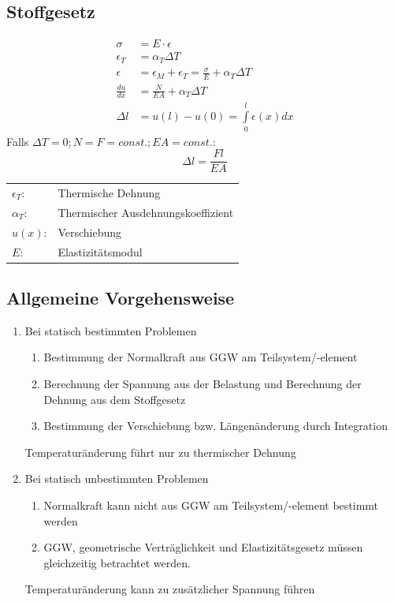 \documentclass[a4paper,twocolumn,10pt]{article}
\begin{document}
\subsection{Stoffgesetz}
\begin{equation*}
\begin{split}
\sigma&=E\cdot\epsilon\\
\epsilon_T&=\alpha_T\Delta T\\
\epsilon&=\epsilon_M+\epsilon_T=\frac{\sigma}{E}+\alpha_T\Delta T\\
\frac{du}{dx}&=\frac{N}{EA}+\alpha_T\Delta T\\
\Delta l&=u(l)-u(0)=\int\limits_0^l\epsilon(x)dx
\end{split}
\end{equation*}
Falls $\Delta T=0;N=F=const.; EA=const.$:
\begin{equation*}
\Delta l=\frac{Fl}{EA}
\end{equation*}
\begin{tabular}{ll}
$\epsilon_T$: & Thermische Dehnung\\
$\alpha_T$: & Thermischer Ausdehnungskoeffizient\\
$u(x)$: & Verschiebung\\
$E$: & Elastizitätsmodul
\end{tabular}

\subsection{Allgemeine Vorgehensweise}
\begin{enumerate}
\item Bei statisch bestimmten Problemen
\begin{enumerate}
\item Bestimmung der Normalkraft aus GGW am Teilsystem/-element
\item Berechnung der Spannung aus der Belastung und Berechnung der Dehnung aus dem Stoffgesetz
\item Bestimmung der Verschiebung bzw. Längenänderung durch Integration
\end{enumerate}
Temperaturänderung führt nur zu thermischer Dehnung
\item Bei statisch unbestimmten Problemen
\begin{enumerate}
\item Normalkraft kann nicht aus GGW am Teilsystem/-element bestimmt werden
\item GGW, geometrische Verträglichkeit und Elastizitätsgesetz müssen gleichzeitig betrachtet werden.
\end{enumerate}
Temperaturänderung kann zu zusätzlicher Spannung führen
\end{enumerate}
\end{document}
